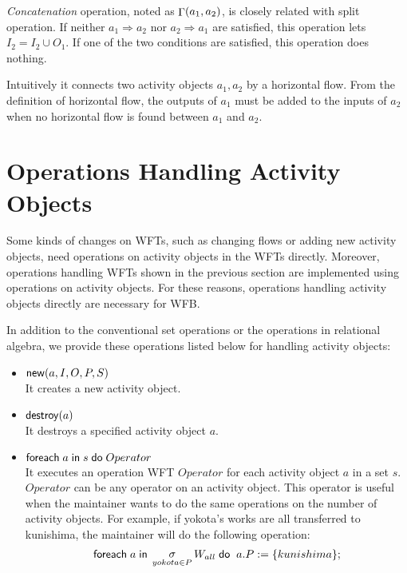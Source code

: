 {\em Concatenation} operation, noted as $\mathop{\Gamma}(a_1, a_2)$, is
closely related with split operation.
If neither $a_1 \Longrightarrow a_2$ nor $a_2 \Longrightarrow
a_1$ are satisfied, this operation lets $I_2 = I_2 \cup O_1$.  If
one of the two conditions are satisfied, this operation does
nothing.

Intuitively it connects two activity objects $a_1, a_2$ by a
horizontal flow.  From the definition of horizontal flow, the
outputs of $a_1$ must be added to the inputs of $a_2$ when no
horizontal flow is found between $a_1$ and $a_2$.

\section{Operations Handling Activity Objects}
\label{sec:changeaoop}

Some kinds of changes on WFTs, such as changing flows or adding new
activity objects, need operations on activity objects in the WFTs
directly.  Moreover, operations handling WFTs shown in the previous
section are implemented using operations on activity objects.  For these 
reasons, operations handling activity objects directly are necessary for 
WFB.  

In addition to the conventional set operations or the operations in
relational algebra, we provide these operations listed below for
handling activity objects:
\begin{itemize}
 \item ${\sf new}(a, I, O, P, S)$\\
       It creates a new activity object.
 \item ${\sf destroy}(a)$\\
       It destroys a specified activity object $a$.
 \item ${\sf foreach}\; a\; {\sf in}\; s\; {\sf do}\;
       Operator$\\
       It executes an operation WFT $Operator$ for each activity object
       $a$ in a set $s$.  $Operator$ can be any operator on an activity
       object.  This operator is useful when the maintainer wants to do
       the same operations on the number of activity objects.  For
       example, if yokota's works are all transferred to kunishima, the
       maintainer will do the following operation:
       \[
	{\sf foreach}\; a\; {\sf in}\;
       \mathop{\sigma}_{yokota\in P} W_{all} \; {\sf do}
       \;\; a.P := \{kunishima\};
       \]
\end{itemize}

